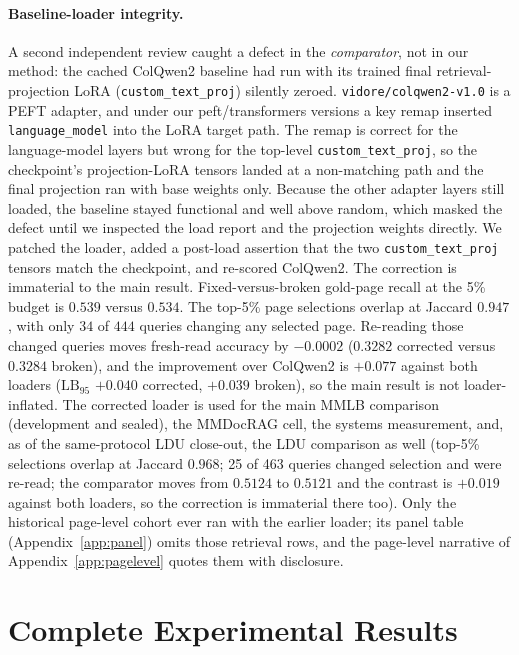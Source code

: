 \documentclass[letterpaper]{article} %
\newcommand{\lb}{\mathrm{LB}_{95}}
\begin{document}
\paragraph{Baseline-loader integrity.} A second independent review caught a
defect in the \emph{comparator}, not in our method: the cached ColQwen2
baseline had run with its trained final retrieval-projection LoRA
(\texttt{custom\_text\_proj}) silently zeroed. \texttt{vidore/colqwen2-v1.0}
is a PEFT adapter, and under our peft/transformers versions a key remap
inserted \texttt{language\_model} into the LoRA target path. The remap is
correct for the language-model layers but wrong for the top-level
\texttt{custom\_text\_proj}, so the checkpoint's projection-LoRA tensors
landed at a non-matching path and the final projection ran with base weights
only. Because the other adapter layers still loaded, the baseline stayed
functional and well above random, which masked the defect until we inspected
the load report and the projection weights directly. We patched the loader,
added a post-load assertion that the two \texttt{custom\_text\_proj} tensors
match the checkpoint, and re-scored ColQwen2. The correction is immaterial to
the main result. Fixed-versus-broken gold-page recall at the 5\% budget is
$0.539$ versus $0.534$. The top-5\% page selections overlap at Jaccard
$0.947$, with only $34$ of $444$ queries changing any selected page.
Re-reading those changed queries moves fresh-read accuracy by $-0.0002$
($0.3282$ corrected versus $0.3284$ broken), and the improvement over
ColQwen2 is $+0.077$ against both loaders ($\lb$ $+0.040$
corrected, $+0.039$ broken), so the main result is not loader-inflated.
The corrected loader is used for the main MMLB comparison
(development and sealed), the MMDocRAG cell, the systems measurement, and,
as of the same-protocol LDU close-out, the LDU comparison as
well (top-5\% selections overlap at Jaccard $0.968$; 25 of 463 queries
changed selection and were re-read; the comparator moves from $0.5124$ to
$0.5121$ and the contrast is $+0.019$ against both loaders, so the
correction is immaterial there too). Only the historical page-level cohort
ever ran with the earlier loader; its panel table
(Appendix~\ref{app:panel}) omits those retrieval rows, and the page-level
narrative of Appendix~\ref{app:pagelevel} quotes them with disclosure.

\section{Complete Experimental Results}\label{app:results}
\end{document}
